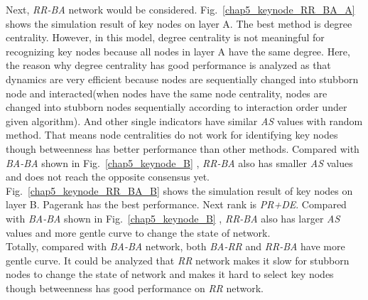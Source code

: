 Next, \textit{RR-BA} network would be considered. Fig.~\ref{chap5_keynode_RR_BA_A} shows the simulation result of key nodes on layer A. The best method is degree centrality. However, in this model, degree centrality is not meaningful for recognizing key nodes because all nodes in layer A have the same degree. Here, the reason why degree centrality has good performance is analyzed as that dynamics are very efficient because nodes are sequentially changed into stubborn node and interacted(when nodes have the same node centrality, nodes are changed into stubborn nodes sequentially according to interaction order under given algorithm). And other single indicators have similar \textit{AS} values with random method. That means node centralities do not work for identifying key nodes though betweenness has better performance than other methods. Compared with \textit{BA-BA} shown in Fig.~\ref{chap5_keynode_B} , \textit{RR-BA} also has smaller \textit{AS} values and does not reach the opposite consensus yet. \\
Fig.~\ref{chap5_keynode_RR_BA_B} shows the simulation result of key nodes on layer B. Pagerank has the best performance. Next rank is \textit{PR+DE}.  Compared with \textit{BA-BA} shown in Fig.~\ref{chap5_keynode_B} , \textit{RR-BA} also has larger \textit{AS} values and more gentle curve to change the state of network. \\ 
Totally, compared with \textit{BA-BA} network, both \textit{BA-RR} and \textit{RR-BA} have more gentle curve. It could be analyzed that \textit{RR} network makes it slow for stubborn nodes to change the state of network and makes it hard to select key nodes though betweenness has good performance on \textit{RR} network.\\  

